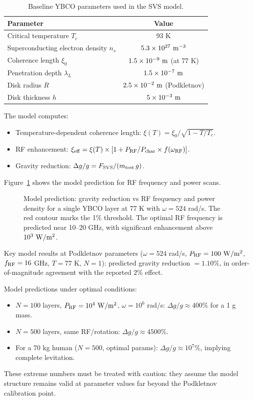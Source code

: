 \documentclass[12pt,a4paper]{article}
\begin{document}
\begin{table}[h]
\caption{Baseline YBCO parameters used in the SVS model.}
\label{tab:ybcoparam}
\centering
\begin{tabular}{lc}
\hline
Parameter & Value\\\hline
Critical temperature $T_c$ & 93 K\\
Superconducting electron density $n_s$ & $5.3\times10^{27}\ {\rm m^{-3}}$\\
Coherence length $\xi_0$ & $1.5\times10^{-9}\ {\rm m}$ (at 77 K)\\
Penetration depth $\lambda_L$ & $1.5\times10^{-7}\ {\rm m}$\\
Disk radius $R$ & $2.5\times10^{-2}\ {\rm m}$ (Podkletnov)\\
Disk thickness $h$ & $5\times10^{-3}\ {\rm m}$\\\hline
\end{tabular}
\end{table}

The model computes:
\begin{itemize}
    \item Temperature-dependent coherence length: $\xi(T)=\xi_0/\sqrt{1-T/T_c}$.
    \item RF enhancement: $\xi_{\rm eff}=\xi(T)\times[1+P_{\rm RF}/P_{\rm char}\times f(\omega_{\rm RF})]$.
    \item Gravity reduction: $\Delta g/g = F_{\rm SVS}/(m_{\rm test}\,g)$.
\end{itemize}

Figure~\ref{fig:rfscan} shows the model prediction for RF frequency and power scans.

\begin{figure}[h]
\centering
\caption{Model prediction: gravity reduction vs RF frequency and power density for a single YBCO layer at 77 K with $\omega=524$ rad/s. The red contour marks the 1\% threshold. The optimal RF frequency is predicted near 10--20 GHz, with significant enhancement above $10^3\ {\rm W/m^2}$.}
\label{fig:rfscan}
\end{figure}

Key model results at Podkletnov parameters ($\omega=524$ rad/s, $P_{\rm RF}=100\ {\rm W/m^2}$, $f_{\rm RF}=16$ GHz, $T=77$ K, $N=1$): predicted gravity reduction $=1.10\%$, in order-of-magnitude agreement with the reported $2\%$ effect.

Model predictions under optimal conditions:
\begin{itemize}
    \item $N=100$ layers, $P_{\rm RF}=10^4\ {\rm W/m^2}$, $\omega=10^6$ rad/s: $\Delta g/g\approx 400\%$ for a 1 g mass.
    \item $N=500$ layers, same RF/rotation: $\Delta g/g\approx 4500\%$.
    \item For a 70 kg human ($N=500$, optimal params): $\Delta g/g\approx 10^7\%$, implying complete levitation.
\end{itemize}
These extreme numbers must be treated with caution: they assume the model structure remains valid at parameter values far beyond the Podkletnov calibration point.
\end{document}
